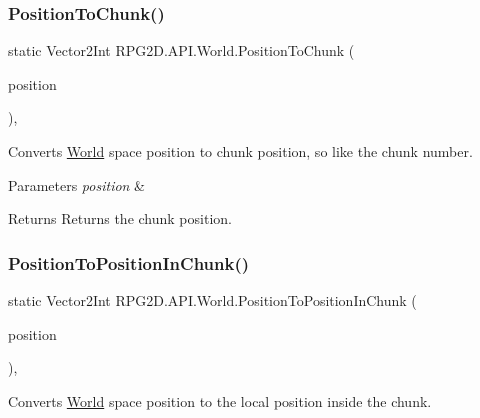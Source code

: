 \subsubsection{\texorpdfstring{Position\+To\+Chunk()}{PositionToChunk()}}
{\footnotesize\ttfamily static Vector2\+Int R\+P\+G2\+D.\+A\+P\+I.\+World.\+Position\+To\+Chunk (\begin{DoxyParamCaption}\item[{Vector2\+Int}]{position }\end{DoxyParamCaption})\hspace{0.3cm}{\ttfamily [inline]}, {\ttfamily [static]}}



Converts \mbox{\hyperlink{class_r_p_g2_d_1_1_a_p_i_1_1_world}{World}} space position to chunk position, so like the chunk number. 


\begin{DoxyParams}{Parameters}
{\em position} & \\
\hline
\end{DoxyParams}
\begin{DoxyReturn}{Returns}
Returns the chunk position.
\end{DoxyReturn}
\mbox{\label{class_r_p_g2_d_1_1_a_p_i_1_1_world_a46adadcf2bd6165b14a803f7494c1219}} 
\subsubsection{\texorpdfstring{Position\+To\+Position\+In\+Chunk()}{PositionToPositionInChunk()}}
{\footnotesize\ttfamily static Vector2\+Int R\+P\+G2\+D.\+A\+P\+I.\+World.\+Position\+To\+Position\+In\+Chunk (\begin{DoxyParamCaption}\item[{Vector2\+Int}]{position }\end{DoxyParamCaption})\hspace{0.3cm}{\ttfamily [inline]}, {\ttfamily [static]}}



Converts \mbox{\hyperlink{class_r_p_g2_d_1_1_a_p_i_1_1_world}{World}} space position to the local position inside the chunk. 



